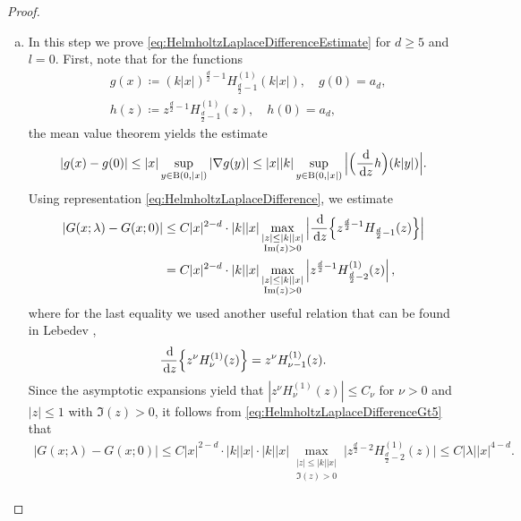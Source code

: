 \begin{proof}
\begin{enumerate}[(a)]
  \item In this step we prove \eqref{eq:HelmholtzLaplaceDifferenceEstimate} for $d \geq 5$ and $l = 0$. 
    First, note that for the functions
    \begin{align*}
      &g(x) \coloneqq (k|x|)^{\frac{d}{2} - 1} H_{\frac{d}{2} - 1}^{(1)}(k|x|), \quad g(0) = a_d, \\
      &h(z) \coloneqq z^{\frac{d}{2} - 1} H_{\frac{d}{2} - 1}^{(1)}(z), \quad h(0) = a_d,
    \end{align*}
    the mean value theorem yields the estimate
    \begin{align*}
      |g(x) - g(0)| \leq |x| \sup_{y \in \mathrm{B}(0,|x|)} |\nabla g(y)| \leq |x| |k| \sup_{y \in \mathrm{B}(0,|x|)}  \Big| \Big(\frac{\, {\operatorname{d}\!{}}}{\, {\operatorname{d}\!{z}}} h \Big) (k|y|)\Big|.
    \end{align*}
    Using representation \eqref{eq:HelmholtzLaplaceDifference}, we estimate
    \begin{align}
      |G(x; \lambda) - G(x; 0) |
      &\leq C |x|^{2 - d} \cdot |k| |x| \max_{\substack{|z| \leq |k| |x| \\ \operatorname{Im}(z) > 0}} \Big| \frac{\, {\operatorname{d}\!{}}}{\, {\operatorname{d}\!{z}}} \Big\{ z^{\frac{d}{2} - 1} H_{\frac{d}{2} - 1}(z) \Big\} \Big| \nonumber\\
      &= C |x|^{2 - d} \cdot |k| |x| \max_{\substack{|z| \leq |k||x| \\ \operatorname{Im}(z) > 0}} \Big|z^{\frac{d}{2} - 1} H_{\frac{d}{2} - 2}^{(1)}(z) \Big| \, , \label{eq:HelmholtzLaplaceDifferenceGt5}
    \end{align}
    where for the last equality we used another useful relation that can be found in Lebedev \cite[Eq. (5.6.3)]{lebedev},
    \begin{align}
      \frac{\, {\operatorname{d}\!{}}}{\, {\operatorname{d}\!{z}}} \Big\{ z^\nu H_\nu^{(1)}(z) \Big\} = z^\nu H_{\nu - 1}^{(1)}(z).
    \end{align}
    Since the asymptotic expansions yield that $|z^{\nu} H_\nu^{(1)}(z)| \leq C_\nu$ for $\nu > 0$ and $|z| \leq 1$ with $\Im(z) > 0$, it follows from \eqref{eq:HelmholtzLaplaceDifferenceGt5} that
    \begin{align*}
      |G(x;\lambda) - G(x; 0)| \leq C |x|^{2 - d} \cdot |k| |x| \cdot |k| |x| \max_{\substack{|z| \leq |k||x| \\ \Im(z) > 0}} \Big|z^{\frac{d}{2} - 2} H_{\frac{d}{2} - 2}^{(1)}(z) \Big|
      \leq C |\lambda| |x|^{4 - d}.
    \end{align*}
    

\end{enumerate}
\end{proof}
